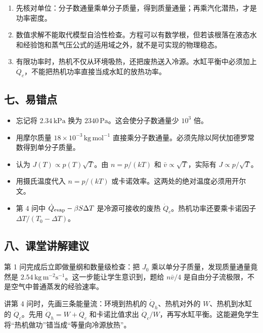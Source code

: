 \documentclass[12pt,a4paper,UTF8]{ctexart}
\newcommand{\tightlist}{\setlength{\itemsep}{0pt}\setlength{\parskip}{0pt}}
\begin{document}
\begin{enumerate}
\def\labelenumi{\arabic{enumi}.}
\tightlist
\item
  先核对单位：分子数通量乘单分子质量，得到质量通量；再乘汽化潜热，才是功率密度。
\item
  数值求解不能取代模型自洽性检查。方程可以有数学根，但若该根落在液态水和经验饱和蒸气压公式的适用域之外，就不是可实现的物理稳态。
\item
  有限功率时，热机不仅从环境吸热，还把废热送入冷源。水缸平衡中必须加上
  \(\dot Q_c\)，不能把热机功率直接当成水缸的放热功率。
\end{enumerate}

\subsection{七、易错点}\label{ux4e03ux6613ux9519ux70b9-6}

\begin{itemize}
\tightlist
\item
  忘记将 \(2.34\,\mathrm{kPa}\) 换为
  \(2340\,\mathrm{Pa}\)。这会使分子数通量少 \(10^3\) 倍。
\item
  用摩尔质量 \(18\times10^{-3}\,\mathrm{kg\,mol^{-1}}\)
  直接乘分子数通量。必须先除以阿伏加德罗常数得到单分子质量。
\item
  认为 \(J(T)\propto p(T)\sqrt T\)。由 \(n=p/(kT)\) 和
  \(\bar v\propto\sqrt T\)，实际有 \(J\propto p/\sqrt T\)。
\item
  用摄氏温度代入 \(n=p/(kT)\) 或卡诺效率。这两处的绝对温度必须用开尔文。
\item
  第 4 问中 \(\dot Q_{\rm evap}-\beta S\Delta T\) 是冷源可接收的废热
  \(\dot Q_c\)。热机功率还要乘卡诺因子 \(\Delta T/(T_0-\Delta T)\)。
\end{itemize}

\subsection{八、课堂讲解建议}\label{ux516bux8bfeux5802ux8bb2ux89e3ux5efaux8bae-6}

第 1 问完成后立即做量纲和数量级检查：把 \(J_0\)
乘以单分子质量，发现质量通量竟然是
\(2.54\,\mathrm{kg\,m^{-2}s^{-1}}\)。这一步能让学生意识到，题给
\(n\bar v/4\) 是自由分子流极限，不是空气中普通蒸发的经验速率。

讲第 4 问时，先画三条能量流：环境到热机的 \(\dot Q_h\)、热机对外的
\(W\)、热机到水缸的 \(\dot Q_c\)。先用 \(\dot Q_h=W+\dot Q_c\)
和卡诺比值求出
\(\dot Q_c/W\)，再写水缸平衡。这能避免学生将``热机做功''错当成``等量向冷源放热''。
\end{document}
